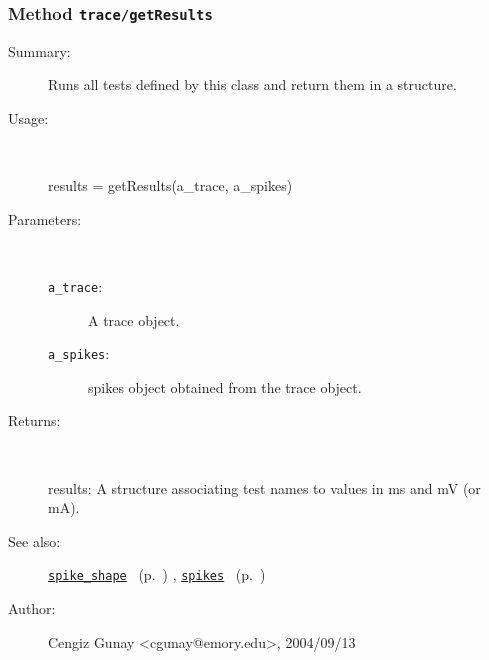 \subsubsection[Method \texttt{getResults}]{Method \texttt{trace/getResults}}%
%
\label{ref_trace__getResults}%
\hypertarget{ref_trace__getResults}{}%
\begin{description}
\item[Summary:]Runs all tests defined by this class and return them in a 
		structure.
%
\item[Usage:]~%
\begin{lyxcode}%
results = getResults(a\_trace, a\_spikes)
%
\end{lyxcode}%
%
%
\item[Parameters:]~
\begin{description}%
\item[\texttt{a\_trace}:]
 A trace object.
\item[\texttt{a\_spikes}:]
 spikes object obtained from the trace object.
\end{description}%
%
\item[Returns:
]~

	results: A structure associating test names to values 
		in ms and mV (or mA).
%
%
\item[See also:]%
\hyperlink{ref_spike_shape}{\texttt{spike\_shape}}%
\ (p.~\pageref{ref_spike_shape})%
%
, \hyperlink{ref_spikes}{\texttt{spikes}}%
\ (p.~\pageref{ref_spikes})%
%
%
\item[Author:]%
Cengiz Gunay <cgunay@emory.edu>, 2004/09/13
%
\end{description}
\methodline%
